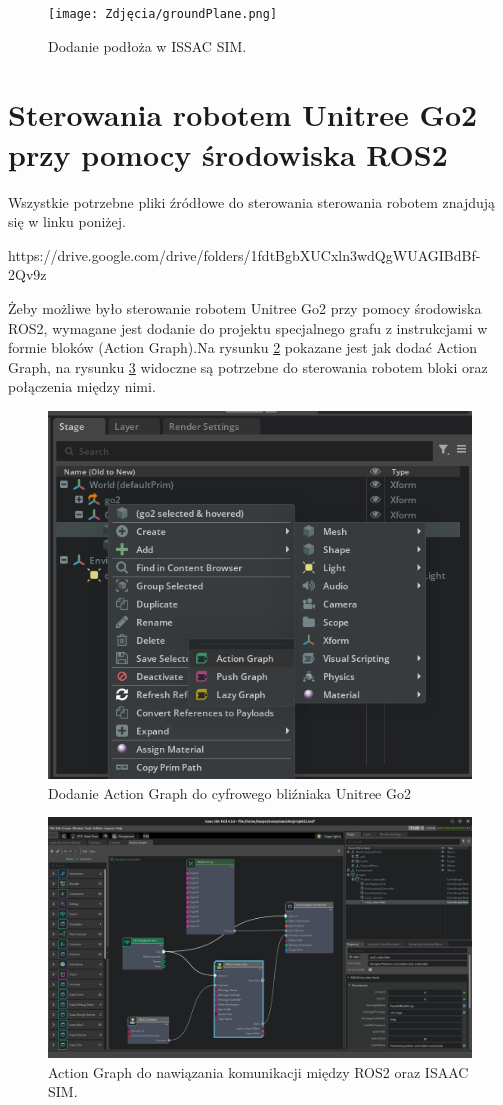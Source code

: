 \documentclass[12pt]{article}
\begin{document}
\begin{figure}[h]
    \centering
    \texttt{[image: Zdjęcia/groundPlane.png]}
    \caption{Dodanie podłoża w ISSAC SIM.}
    \label{fig:groundPlane}
\end{figure}

\clearpage

\section{Sterowania robotem Unitree Go2 przy pomocy środowiska ROS2}

Wszystkie potrzebne pliki źródłowe do sterowania sterowania robotem znajdują się w linku poniżej.

https://drive.google.com/drive/folders/1fdtBgbXUCxln3wdQgWUAGIBdBf-2Qv9z
\vspace{10pt}

\noindent Żeby możliwe było sterowanie robotem Unitree Go2 przy pomocy środowiska ROS2, wymagane jest dodanie do projektu specjalnego grafu z instrukcjami w formie bloków (Action Graph).Na rysunku \ref{fig:jakDodacAction} pokazane jest jak dodać Action Graph, na rysunku \ref{fig:actionGraph} widoczne są potrzebne do sterowania robotem bloki oraz połączenia między nimi. 

\begin{figure}[h]
    \centering
    \includegraphics[width=0.7\linewidth]{Zdjęcia/dodanieActionGraph.png}
    \caption{Dodanie Action Graph do cyfrowego bliźniaka Unitree Go2}
    \label{fig:jakDodacAction}
\end{figure}

\clearpage

\begin{figure}[h]
    \centering
    \includegraphics[width=0.75\linewidth]{Zdjęcia/actionGraph.png}
    \caption{Action Graph do nawiązania komunikacji między ROS2 oraz ISAAC SIM.}
    \label{fig:actionGraph}
\end{figure}
\end{document}
